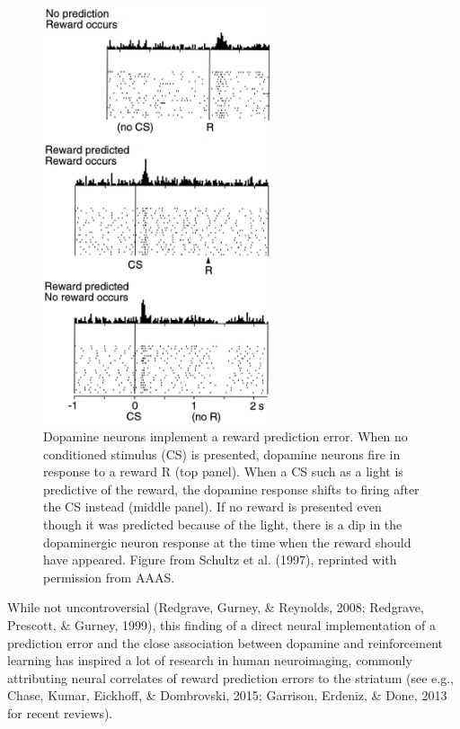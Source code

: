 \documentclass[12pt,openany]{book}
\theoremstyle{definition}
\theoremstyle{definition}
\theoremstyle{definition}
\theoremstyle{remark}
\begin{document}
\begin{figure}
\centering
\includegraphics[width=0.60000\textwidth]{./figures/schultz.jpg}
\caption{Dopamine neurons implement a reward prediction error. When no
conditioned stimulus (CS) is presented, dopamine neurons fire in
response to a reward R (top panel). When a CS such as a light is
predictive of the reward, the dopamine response shifts to firing after
the CS instead (middle panel). If no reward is presented even though it
was predicted because of the light, there is a dip in the dopaminergic
neuron response at the time when the reward should have appeared. Figure
from Schultz et al. (1997), reprinted with permission from
AAAS.\label{fig_schultz}}
\end{figure}

While not uncontroversial (Redgrave, Gurney, \& Reynolds, 2008;
Redgrave, Prescott, \& Gurney, 1999), this finding of a direct neural
implementation of a prediction error and the close association between
dopamine and reinforcement learning has inspired a lot of research in
human neuroimaging, commonly attributing neural correlates of reward
prediction errors to the striatum (see e.g., Chase, Kumar, Eickhoff, \&
Dombrovski, 2015; Garrison, Erdeniz, \& Done, 2013 for recent reviews).
\end{document}
